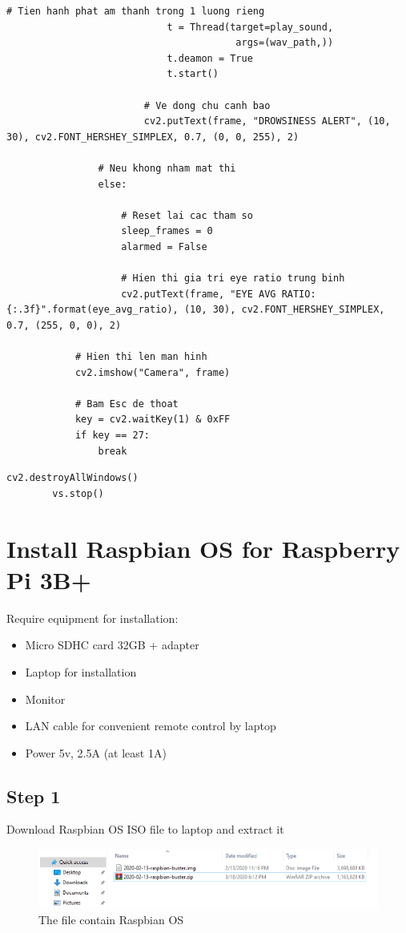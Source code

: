 \begin{lstlisting}[caption={Doc tu camera}]
                            # Tien hanh phat am thanh trong 1 luong rieng
                            t = Thread(target=play_sound,
                                        args=(wav_path,))
                            t.deamon = True
                            t.start()

                        # Ve dong chu canh bao
                        cv2.putText(frame, "DROWSINESS ALERT", (10, 30), cv2.FONT_HERSHEY_SIMPLEX, 0.7, (0, 0, 255), 2)

                # Neu khong nham mat thi
                else:

                    # Reset lai cac tham so
                    sleep_frames = 0
                    alarmed = False

                    # Hien thi gia tri eye ratio trung binh
                    cv2.putText(frame, "EYE AVG RATIO: {:.3f}".format(eye_avg_ratio), (10, 30),	cv2.FONT_HERSHEY_SIMPLEX, 0.7, (255, 0, 0), 2)

            # Hien thi len man hinh
            cv2.imshow("Camera", frame)

            # Bam Esc de thoat
            key = cv2.waitKey(1) & 0xFF
            if key == 27:
                break
    \end{lstlisting}

    \begin{lstlisting}[caption={End program}]
        cv2.destroyAllWindows()
        vs.stop()
    \end{lstlisting}

\section{Install Raspbian OS for Raspberry Pi 3B+}
    Require equipment for installation: 
    \begin{itemize}
        \item Micro SDHC card 32GB + adapter 
        \item Laptop for installation 
        \item Monitor 
        \item LAN cable for convenient remote control by laptop
        \item Power 5v, 2.5A (at least 1A) 
    \end{itemize}
    \subsection{Step 1}
        Download Raspbian OS ISO file to laptop and extract it
        \begin{figure}[H]
            \centering
            \includegraphics[width=0.6\linewidth]{img/download.PNG}
            \caption{The file contain Raspbian OS}
        \end{figure}

